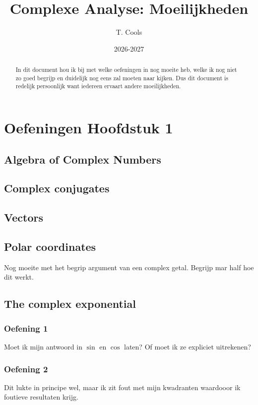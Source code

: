 \documentclass[a4paper,twoside]{article}
\title{Complexe Analyse: Moeilijkheden}
\author{T. Cools}
\date{2026-2027}
\theoremstyle{definition}
\theoremstyle{plain}
\begin{document}
\maketitle
\begin{abstract}
    In dit document hou ik bij met welke oefeningen in nog moeite heb, welke ik nog niet zo goed begrijp en duidelijk nog eens zal moeten naar kijken.
    Dus dit document is redelijk persoonlijk want iedereen ervaart andere moeilijkheden.
\end{abstract}

\section{Oefeningen Hoofdstuk 1}

\subsection{Algebra of Complex Numbers}

\subsection{Complex conjugates}

\subsection{Vectors}

\subsection{Polar coordinates}

Nog moeite met het begrip argument van een complex getal.
Begrijp mar half hoe dit werkt.

\subsection{The complex exponential}
\subsubsection{Oefening 1}
Moet ik mijn antwoord in \(\sin\) en \(\cos\) laten?
Of moet ik ze expliciet uitrekenen?
\subsubsection{Oefening 2}
Dit lukte in principe wel, maar ik zit fout met mijn kwadranten waardooor ik foutieve resultaten krijg.
\end{document}
